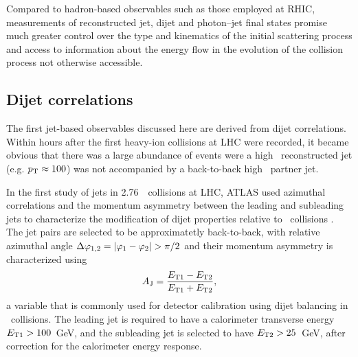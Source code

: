Compared to hadron-based observables such as those employed at RHIC, measurements of reconstructed
jet, dijet and photon--jet final states promise much greater control over the type and kinematics
of the initial scattering process and access to information about the energy flow in the evolution
of the collision process not otherwise accessible.

\subsection{Dijet correlations}

The first jet-based observables discussed here are derived from dijet correlations. Within hours
after the first heavy-ion collisions at LHC were recorded, it became obvious that there was
a large abundance of events were a high \pT\ reconstructed jet (e.g. $\mbox{$p_{\mathrm{T}}$} \approx 100$\GeVc) was
not accompanied by a back-to-back high \pT\ partner jet.

In the first study of jets in 2.76\TeV\ \PbPb\ collisions at LHC, ATLAS used azimuthal correlations and the
momentum asymmetry between the leading and subleading jets to characterize the modification
of dijet properties relative to \pp\ collisions \cite{Aad:2010bu}.
The jet pairs are selected to be approximatetly back-to-back, with relative
azimuthal angle $\Delta\varphi_{1,2} =|\varphi_1-\varphi_2| > \pi/2$
and their momentum asymmetry is characterized using
\begin{equation}
A_\mathrm{J} = \frac{E_{\rm{T}1}-E_{\rm{T}2}}{E_{\rm{T}1}+E_{\rm{T}2}},
\end{equation}
a variable that is commonly used for detector calibration using dijet balancing in \pp\ collisions.
The leading jet is required to have a calorimeter transverse energy $E_{\rm{T}1} > 100$~GeV,
and the subleading jet is selected to have $E_{\rm{T}2} > 25$~GeV, after correction for
the calorimeter energy response.

